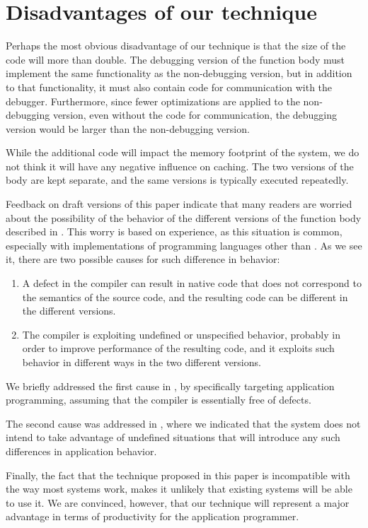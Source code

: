 \section{Disadvantages of our technique}

Perhaps the most obvious disadvantage of our technique is that the
size of the code will more than double.  The debugging version of the
function body must implement the same functionality as the
non-debugging version, but in addition to that functionality, it must
also contain code for communication with the debugger.  Furthermore,
since fewer optimizations are applied to the non-debugging version,
even without the code for communication, the debugging version would
be larger than the non-debugging version.

While the additional code will impact the memory footprint of the
system, we do not think it will have any negative influence on
caching.  The two versions of the body are kept separate, and the same
versions is typically executed repeatedly.

Feedback on draft versions of this paper indicate that many readers
are worried about the possibility of the behavior of the different
versions of the function body described in
.  This worry is based on experience,
as this situation is common, especially with implementations of
programming languages other than \commonlisp{}.  As we see it, there
are two possible causes for such difference in behavior:

\begin{enumerate}
\item A defect in the compiler can result in native code that does not
  correspond to the semantics of the source code, and the resulting
  code can be different in the different versions.
\item The compiler is exploiting undefined or unspecified behavior,
  probably in order to improve performance of the resulting code, and
  it exploits such behavior in different ways in the two different
  versions.
\end{enumerate}

We briefly addressed the first cause in , by
specifically targeting application programming, assuming that the
compiler is essentially free of defects.

The second cause was addressed in , where we
indicated that the \sicl{} system does not intend to take advantage of
undefined situations that will introduce any such differences in
application behavior.

Finally, the fact that the technique proposed in this paper is
incompatible with the way most \commonlisp{} systems work, makes it
unlikely that existing systems will be able to use it.  We are
convinced, however, that our technique will represent a major
advantage in terms of productivity for the application programmer.
